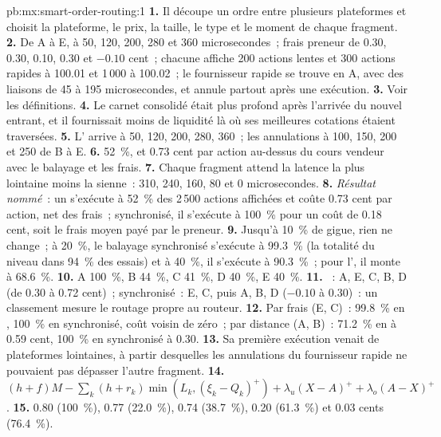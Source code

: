 \begin{solution}{pb:mx:smart-order-routing:1}
\textbf{1.} Il découpe un ordre entre plusieurs plateformes et choisit la plateforme, le prix, la taille, le type et le moment de chaque fragment.
\textbf{2.} De A à E, à 50, 120, 200, 280 et 360 microsecondes~; frais preneur de 0.30, 0.30, 0.10, 0.30 et $-0.10$ cent~; chacune affiche 200 actions lentes et 300
actions rapides à 100.01 et 1\,000 à 100.02~; le fournisseur rapide se trouve en A, avec des liaisons de 45 à 195 microsecondes, et annule partout après une exécution.
\textbf{3.} Voir les définitions.
\textbf{4.} Le carnet consolidé était plus profond après l'arrivée du nouvel entrant, et il fournissait moins de liquidité là où ses meilleures cotations étaient traversées.
\textbf{5.} L' arrive à 50, 120, 200, 280, 360~; les annulations à 100, 150, 200 et 250 de B à E.
\textbf{6.} 52~\%, et 0.73 cent par action au-dessus du cours vendeur avec le balayage et les frais.
\textbf{7.} Chaque fragment attend la latence la plus lointaine moins la sienne~: 310, 240, 160, 80 et 0 microsecondes.
\textbf{8.} \emph{Résultat nommé}~: un  s'exécute à 52~\% des 2\,500 actions affichées et coûte 0.73 cent par action, net des frais~; synchronisé, il s'exécute
à 100~\% pour un coût de 0.18 cent, soit le frais moyen payé par le preneur.
\textbf{9.} Jusqu'à 10~\% de gigue, rien ne change~; à 20~\%, le balayage synchronisé s'exécute à 99.3~\% (la totalité du niveau dans 94~\% des essais) et à 40~\%, il s'exécute à 90.3~\%~; pour l', il monte à 68.6~\%.
\textbf{10.} A 100~\%, B 44~\%, C 41~\%, D 40~\%, E 40~\%.
\textbf{11.} ~: A, E, C, B, D (de 0.30 à 0.72 cent)~; synchronisé~: E, C, puis A, B, D ($-0.10$ à 0.30)~: un classement mesure le
routage propre au routeur.
\textbf{12.} Par frais (E, C)~: 99.8~\% en , 100~\% en synchronisé, coût voisin de zéro~; par distance (A, B)~: 71.2~\% en  à 0.59 cent, 100~\% en synchronisé à
0.30.
\textbf{13.} Sa première exécution venait de plateformes lointaines, à partir desquelles les annulations du fournisseur rapide ne pouvaient pas dépasser l'autre fragment.
\textbf{14.} $(h+f)M-\sum_k(h+r_k)\min(L_k,(\xi_k-Q_k)^+)+\lambda_u(X-A)^++\lambda_o(A-X)^+$.
\textbf{15.} 0.80 (100~\%), 0.77 (22.0~\%), 0.74 (38.7~\%), 0.20 (61.3~\%) et 0.03 cents (76.4~\%).

\end{solution}
